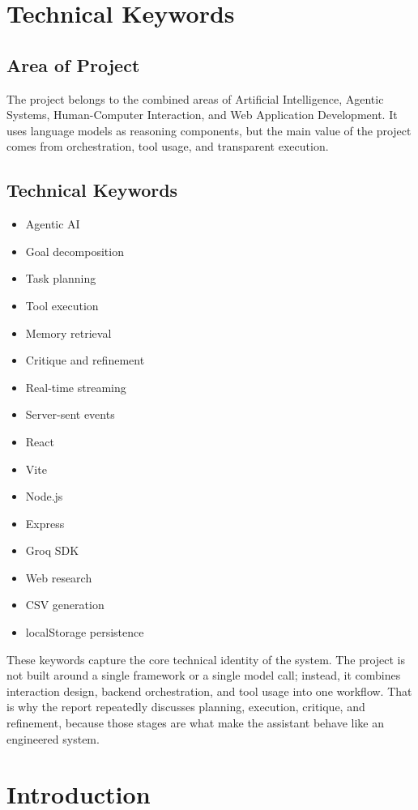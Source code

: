 \documentclass[11pt,oneside]{report}
\begin{document}
\chapter{Technical Keywords}
\section{Area of Project}
The project belongs to the combined areas of Artificial Intelligence, Agentic Systems, Human-Computer Interaction, and Web Application Development. It uses language models as reasoning components, but the main value of the project comes from orchestration, tool usage, and transparent execution.

\section{Technical Keywords}
\begin{itemize}[leftmargin=1.2cm]
  \item Agentic AI
  \item Goal decomposition
  \item Task planning
  \item Tool execution
  \item Memory retrieval
  \item Critique and refinement
  \item Real-time streaming
  \item Server-sent events
  \item React
  \item Vite
  \item Node.js
  \item Express
  \item Groq SDK
  \item Web research
  \item CSV generation
  \item localStorage persistence
\end{itemize}

These keywords capture the core technical identity of the system. The project is not built around a single framework or a single model call; instead, it combines interaction design, backend orchestration, and tool usage into one workflow. That is why the report repeatedly discusses planning, execution, critique, and refinement, because those stages are what make the assistant behave like an engineered system.

\chapter{Introduction}
\end{document}
